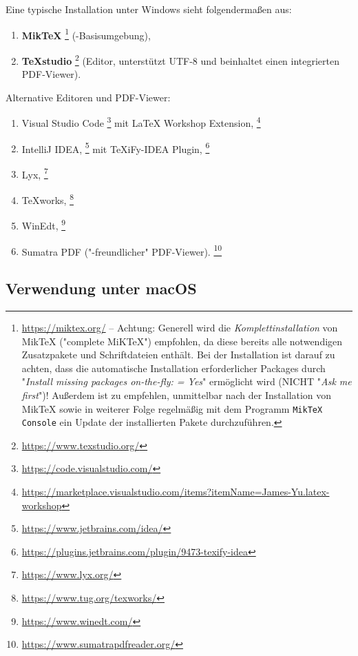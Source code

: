 Eine typische Installation unter Windows sieht folgendermaßen aus:
%
\begin{enumerate}
\item \textbf{MikTeX}%
	\footnote{\url{https://miktex.org/} -- Achtung:
	Generell wird die \emph{Komplettinstallation} von MikTeX ("complete
	MiKTeX") empfohlen, da diese bereits alle notwendigen Zusatzpakete und
	Schriftdateien enthält. Bei der Installation ist darauf zu achten,
	dass die automatische Installation erforderlicher Packages durch
	"\emph{Install missing packages on-the-fly: = Yes}" ermöglicht wird
	(NICHT "\emph{Ask me first}")! Außerdem ist zu empfehlen, unmittelbar
	nach der Installation von MikTeX sowie in weiterer Folge regelmäßig
	mit dem Programm \texttt{MikTeX Console} ein Update der installierten
	Pakete durchzuführen.} (\latex-Basisumgebung),
\item \textbf{TeXstudio}%
	\footnote{\url{https://www.texstudio.org/}}
	(Editor, unterstützt UTF-8 und beinhaltet einen integrierten PDF-Viewer).
\end{enumerate}
%
Alternative Editoren und PDF-Viewer:
%
\begin{enumerate}
	\item Visual Studio Code%
	\footnote{\url{https://code.visualstudio.com/}}
	mit LaTeX Workshop Extension,%
	\footnote{\url{https://marketplace.visualstudio.com/items?itemName=James-Yu.latex-workshop}}
	\item IntelliJ IDEA,%
	\footnote{\url{https://www.jetbrains.com/idea/}}
	mit TeXiFy-IDEA Plugin,%
	\footnote{\url{https://plugins.jetbrains.com/plugin/9473-texify-idea}}
	\item Lyx,%
	\footnote{\url{https://www.lyx.org/}}
	\item TeXworks,%
	\footnote{\url{https://www.tug.org/texworks/}}
	\item WinEdt,%
	\footnote{\url{https://www.winedt.com/}}
	\item Sumatra PDF ("\latex-freundlicher" PDF-Viewer).%
	\footnote{\url{https://www.sumatrapdfreader.org/}}
\end{enumerate}

\subsection{Verwendung unter macOS}

